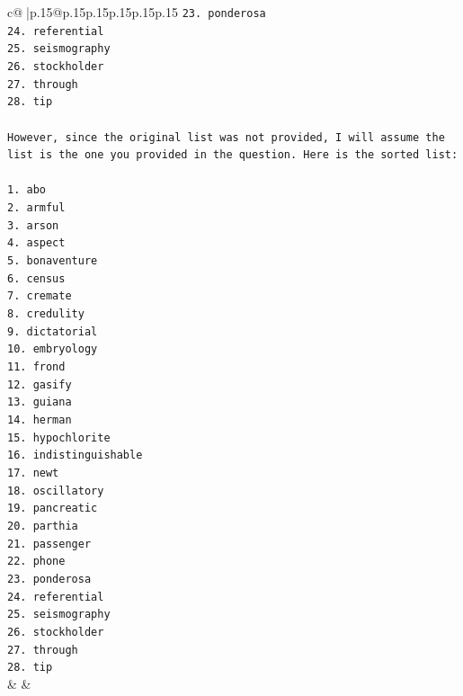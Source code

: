 \documentclass{article}
\begin{document}
{\begin{supertabular}{c@{$\;$}|p{.15\linewidth}@{}p{.15\linewidth}p{.15\linewidth}p{.15\linewidth}p{.15\linewidth}p{.15\linewidth}}
{{{\texttt{23. ponderosa} \\
\texttt{24. referential} \\
\texttt{25. seismography} \\
\texttt{26. stockholder} \\
\texttt{27. through} \\
\texttt{28. tip} \\
\\ 
\texttt{However, since the original list was not provided, I will assume the list is the one you provided in the question. Here is the sorted list:} \\
\\ 
\texttt{1. abo} \\
\texttt{2. armful} \\
\texttt{3. arson} \\
\texttt{4. aspect} \\
\texttt{5. bonaventure} \\
\texttt{6. census} \\
\texttt{7. cremate} \\
\texttt{8. credulity} \\
\texttt{9. dictatorial} \\
\texttt{10. embryology} \\
\texttt{11. frond} \\
\texttt{12. gasify} \\
\texttt{13. guiana} \\
\texttt{14. herman} \\
\texttt{15. hypochlorite} \\
\texttt{16. indistinguishable} \\
\texttt{17. newt} \\
\texttt{18. oscillatory} \\
\texttt{19. pancreatic} \\
\texttt{20. parthia} \\
\texttt{21. passenger} \\
\texttt{22. phone} \\
\texttt{23. ponderosa} \\
\texttt{24. referential} \\
\texttt{25. seismography} \\
\texttt{26. stockholder} \\
\texttt{27. through} \\
\texttt{28. tip} \\
            }
        }
    }
    & & \\ \\


\end{supertabular}}
\end{document}
